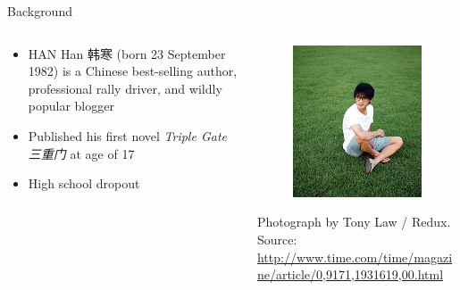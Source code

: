 \documentclass[12pt, trans]{beamer}
\newcommand{\1}[1]{{\mathbf 1}\left\{#1\right\}}        %
\begin{document}
\begin{frame}{Background}

\note{
}

 \begin{columns}[t]
 \begin{column}{0.6\textwidth}

	\begin{itemize}[<+->]
	\item  HAN Han 韩寒 (born 23 September 1982) is a Chinese best-selling author, professional rally driver, and  wildly  popular blogger
	\item Published his first novel {\em Triple Gate 三重门} at age of 17
	\item High school dropout
	\end{itemize}

 \end{column}
 
 \begin{column}{0.45\textwidth}
	\begin{figure}
	  \centering
	  \includegraphics[scale=0.4]{han_han.jpg} 
	\end{figure}

{\tiny Photograph by Tony Law / Redux. Source: \url{http://www.time.com/time/magazine/article/0,9171,1931619,00.html}}
 \end{column}
 
 \end{columns}

\end{frame}
\end{document}
